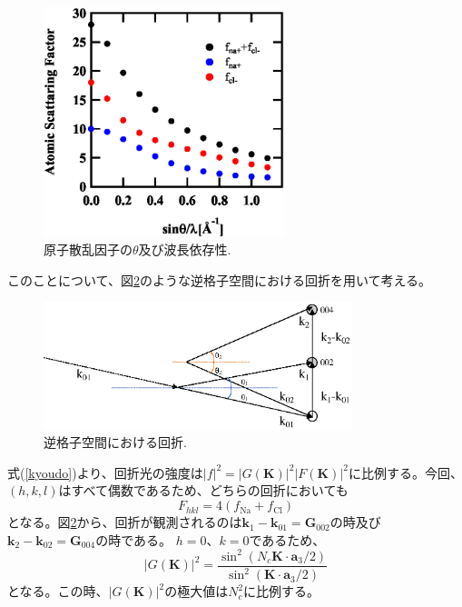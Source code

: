 \documentclass[11pt,a4j,uplatex]{jsarticle}
\begin{document}
\begin{figure}[htb]
 \centering
 \includegraphics[clip,width=7cm]{atomic.eps}
 \caption{原子散乱因子の$\theta$及び波長依存性.}
 \label{atomic}
\end{figure}


このことについて、図\ref{laue2}のような逆格子空間における回折を用いて考える。
\begin{figure}[htb]
 \centering
 \includegraphics[clip,width=9cm]{laue2.eps}
 \caption{逆格子空間における回折.}
 \label{laue2}
\end{figure}

\newpage
式(\ref{kyoudo})より、回折光の強度は${|f|}^2={|G\bm{(K)}|^2}{|F\bm{(K)}|^2}$に比例する。今回、$(h,k,l)$はすべて偶数であるため、どちらの回折においても
\begin{equation}
  F_{hkl}=4(f_{\mathrm{Na}}+f_{\mathrm{Cl}})
\end{equation}
となる。図\ref{laue2}から、回折が観測されるのは$\bm{k}_1-\bm{k}_{01}=\bm{G}_{002}$の時及び$\bm{k}_2-\bm{k}_{02}=\bm{G}_{004}$の時である。
$h=0、k=0$であるため、
\begin{equation}
  |G(\bm{K})|^2=\frac{\sin^2(N_c\bm{K}\cdot\bm{a}_3/2)}{\sin^2(\bm{K}\cdot\bm{a}_3/2)}
\end{equation}
となる。この時、$|G(\bm{K})|^2$の極大値は$N_c^2$に比例する。%
\fi
\end{document}
